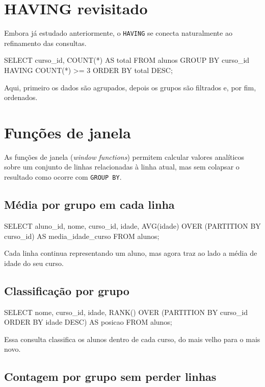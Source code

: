 \section{HAVING revisitado}

Embora já estudado anteriormente, o \texttt{HAVING} se conecta naturalmente ao refinamento das consultas.

\begin{sqlcode}
SELECT curso_id, COUNT(*) AS total
FROM alunos
GROUP BY curso_id
HAVING COUNT(*) >= 3
ORDER BY total DESC;
\end{sqlcode}

Aqui, primeiro os dados são agrupados, depois os grupos são filtrados e, por fim, ordenados.

\section{Funções de janela}

As funções de janela (\textit{window functions}) permitem calcular valores analíticos sobre um conjunto de linhas relacionadas à linha atual, mas sem colapsar o resultado como ocorre com \texttt{GROUP BY}.

\subsection{Média por grupo em cada linha}

\begin{sqlcode}
SELECT
    aluno_id,
    nome,
    curso_id,
    idade,
    AVG(idade) OVER (PARTITION BY curso_id) AS media_idade_curso
FROM alunos;
\end{sqlcode}

Cada linha continua representando um aluno, mas agora traz ao lado a média de idade do seu curso.

\subsection{Classificação por grupo}

\begin{sqlcode}
SELECT
    nome,
    curso_id,
    idade,
    RANK() OVER (PARTITION BY curso_id ORDER BY idade DESC) AS posicao
FROM alunos;
\end{sqlcode}

Essa consulta classifica os alunos dentro de cada curso, do mais velho para o mais novo.

\subsection{Contagem por grupo sem perder linhas}

